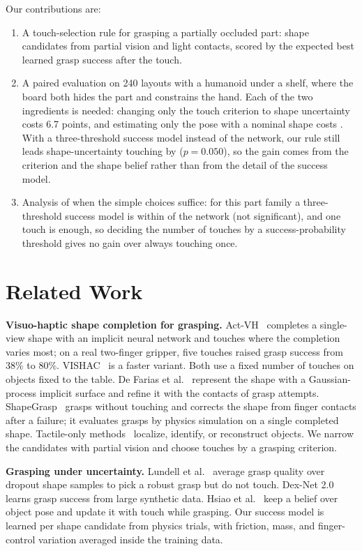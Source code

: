 \documentclass[conference]{IEEEtran}
\begin{document}
Our contributions are:
\begin{enumerate}
\item A touch-selection rule for grasping a partially occluded part: shape candidates from partial vision and light contacts, scored by the expected best learned grasp success after the touch.
\item A paired evaluation on 240 layouts with a humanoid under a shelf, where the board both hides the part and constrains the hand. Each of the two ingredients is needed: changing only the touch criterion to shape uncertainty costs 6.7 points, and estimating only the pose with a nominal shape costs \FixDiffShort. With a three-threshold success model instead of the network, our rule still leads shape-uncertainty touching by \GeomVsUnc{} ($p=0.050$), so the gain comes from the criterion and the shape belief rather than from the detail of the success model.
\item Analysis of when the simple choices suffice: for this part family a three-threshold success model is within \GeomDiffShort{} of the network (not significant), and one touch is enough, so deciding the number of touches by a success-probability threshold gives no gain over always touching once.
\end{enumerate}

\section{Related Work}

\textbf{Visuo-haptic shape completion for grasping.} Act-VH~\cite{rustler2022actvh} completes a single-view shape with an implicit neural network and touches where the completion varies most; on a real two-finger gripper, five touches raised grasp success from 38\% to 80\%. VISHAC~\cite{rustler2023efficient} is a faster variant. Both use a fixed number of touches on objects fixed to the table. De Farias et al.~\cite{defarias2021simultaneous} represent the shape with a Gaussian-process implicit surface and refine it with the contacts of grasp attempts. ShapeGrasp~\cite{rustler2026shapegrasp} grasps without touching and corrects the shape from finger contacts after a failure; it evaluates grasps by physics simulation on a single completed shape. Tactile-only methods~\cite{kamtikar2026tactful,pai2023tactofind,kissoum2023tactile} localize, identify, or reconstruct objects. We narrow the candidates with partial vision and choose touches by a grasping criterion.

\textbf{Grasping under uncertainty.} Lundell et al.~\cite{lundell2019robust} average grasp quality over dropout shape samples to pick a robust grasp but do not touch. Dex-Net 2.0~\cite{mahler2017dexnet2} learns grasp success from large synthetic data. Hsiao et al.~\cite{hsiao2011robust} keep a belief over object pose and update it with touch while grasping. Our success model is learned per shape candidate from physics trials, with friction, mass, and finger-control variation averaged inside the training data.
\end{document}
